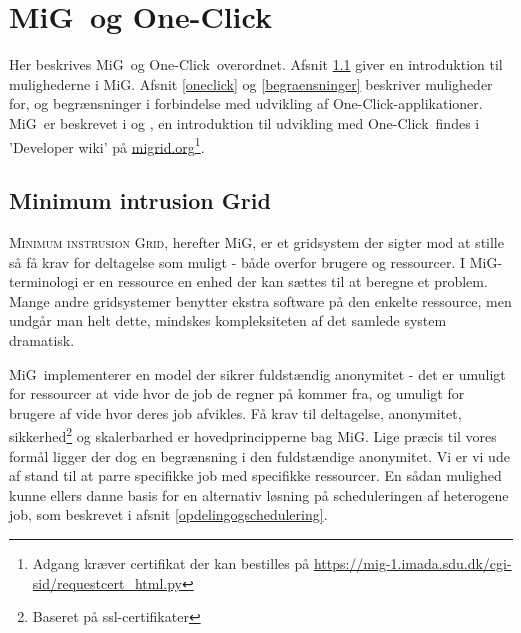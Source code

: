 \documentclass[final,a4paper,11pt]{article}
\newcommand{\mig}{MiG}
\newcommand{\oc}{One-Click}
\begin{document}

\section{\mig\ og \oc}\label{migogoneclick}

	Her beskrives \mig\ og \oc\ overordnet. Afsnit \ref{mig} giver en introduktion til mulighederne i \mig. Afsnit \ref{oneclick} og \ref{begraensninger} beskriver muligheder for, og begrænsninger i forbindelse med udvikling af \oc-applikationer. \mig\ er beskrevet i \cite{simplemig} og \cite{mig}, en introduktion til udvikling med \oc\ findes i 'Developer wiki' på \url{migrid.org}\footnote{Adgang kræver certifikat der kan bestilles på \url{https://mig-1.imada.sdu.dk/cgi-sid/requestcert_html.py}}.

\subsection{Minimum intrusion Grid}\label{mig}

\textsc{Minimum instrusion Grid}, herefter \mig, er et gridsystem der sigter mod at stille så få krav for deltagelse som muligt - både overfor brugere og ressourcer. I \mig-terminologi er en ressource en enhed der kan sættes til at beregne et problem. Mange andre gridsystemer benytter ekstra software på den enkelte ressource, men undgår man helt dette, mindskes kompleksiteten af det samlede system dramatisk. 

\mig\ implementerer en model der sikrer fuldstændig anonymitet - det er umuligt for ressourcer at vide hvor de job de regner på kommer fra, og umuligt for brugere af vide hvor deres job afvikles. Få krav til deltagelse, anonymitet, sikkerhed\footnote{Baseret på ssl-certifikater} og skalerbarhed er hovedprincipperne bag \mig. Lige præcis til vores formål ligger der dog en begrænsning i den fuldstændige anonymitet. Vi er vi ude af stand til at parre specifikke job med specifikke ressourcer. En sådan mulighed kunne ellers danne basis for en alternativ løsning på scheduleringen af heterogene job, som beskrevet i afsnit \ref{opdelingogschedulering}. 
\end{document}
